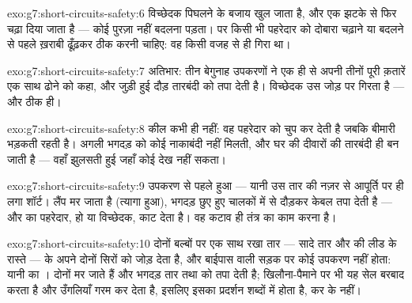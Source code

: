 \begin{solution}{exo:g7:short-circuits-safety:6}
विच्छेदक पिघलने के बजाय खुल जाता है, और एक झटके से फिर चढ़ा दिया जाता
है --- कोई पुरज़ा नहीं बदलना पड़ता। पर किसी भी पहरेदार को दोबारा चढ़ाने
या बदलने से पहले ख़राबी ढूँढ़कर ठीक करनी चाहिए: वह किसी वजह से ही गिरा
था।
\end{solution}

\begin{solution}{exo:g7:short-circuits-safety:7}
अतिभार: तीन बेगुनाह उपकरणों ने एक ही  से अपनी तीनों पूरी क़तारें
एक साथ ढोने को कहा, और जुड़ी हुई दौड़ तारबंदी को तपा देती है। विच्छेदक
उस जोड़ पर गिरता है --- और ठीक ही।
\end{solution}

\begin{solution}{exo:g7:short-circuits-safety:8}
कील कभी  ही नहीं: वह पहरेदार को चुप कर देती है जबकि बीमारी
भड़कती रहती है। अगली भगदड़ को कोई नाकाबंदी नहीं मिलती, और घर की दीवारों
की तारबंदी ही  बन जाती है --- वहाँ झुलसती हुई जहाँ कोई देख नहीं
सकता।
\end{solution}

\begin{solution}{exo:g7:short-circuits-safety:9}
उपकरण से पहले हुआ  --- यानी उस तार की नज़र से आपूर्ति पर ही
लगा शॉर्ट। लैंप मर जाता है (त्यागा हुआ), भगदड़ छुए हुए चालकों में से
दौड़कर केबल तपा देती है --- और  का पहरेदार,  हो या
विच्छेदक,  काट देता है। वह कटाव ही तंत्र का काम करना है।
\end{solution}

\begin{solution}{exo:g7:short-circuits-safety:10}
दोनों बल्बों पर एक साथ रखा तार --- सादे तार और  की लीड के रास्ते
---  के अपने दोनों सिरों को जोड़ देता है, और बाईपास वाली सड़क पर
कोई उपकरण नहीं होता: यानी  का । दोनों  मर जाते हैं और
भगदड़ तार तथा  को तपा देती है; खिलौना-पैमाने पर भी यह सेल बरबाद
करता है और उँगलियाँ गरम कर देता है, इसलिए इसका प्रदर्शन शब्दों में
होता है, कर के नहीं।
\end{solution}

